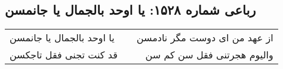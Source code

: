 \begin{center}
\section*{رباعی شماره ۱۵۲۸: یا اوحد بالجمال یا جانمسن}
\label{sec:1528}
\begin{longtable}{l p{0.5cm} r}
یا اوحد بالجمال یا جانمسن
&&
از عهد من ای دوست مگر نادمسن
\\
قد کنت تجنی فقل تاجکسن
&&
والیوم هجرتنی فقل سن کم سن
\\
\end{longtable}
\end{center}
